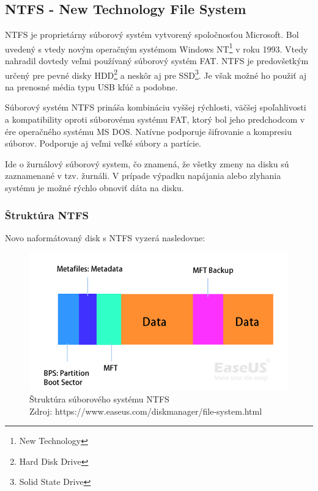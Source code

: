 \documentclass[12pt,oneside,slovak,a4paper]{article}
\begin{document}
\subsection{NTFS - New Technology File System}
NTFS je proprietárny súborový systém vytvorený spoločnosťou Microsoft. Bol uvedený s vtedy novým operačným systémom Windows NT\footnote{New Technology} v roku 1993. Vtedy nahradil dovtedy veľmi používaný súborový systém FAT. NTFS je predovšetkým určený pre pevné disky HDD\footnote{Hard Disk Drive} a neskôr aj pre SSD\footnote{Solid State Drive}. Je však možné ho použiť aj na prenosné média typu USB kľúč a podobne.

Súborový systém NTFS prináša kombináciu vyššej rýchlosti, väčšej spoľahlivosti a kompatibility oproti súborovému systému FAT, ktorý bol jeho predchodcom v ére operačného systému MS DOS. Natívne podporuje šifrovanie a kompresiu súborov. Podporuje aj veľmi veľké súbory a partície.

Ide o žurnálový súborový system, čo znamená, že všetky zmeny na disku sú zaznamenané v tzv. žurnáli. V prípade výpadku napájania alebo zlyhania systému je možné rýchlo obnoviť dáta na disku.

\subsubsection{Štruktúra NTFS}
Novo naformátovaný disk s NTFS vyzerá nasledovne:

\begin{figure}[H]
	\centering
	\captionsetup{justification=centering,margin=2cm}
	\includegraphics[scale=0.59]{./images/file_system_structure/ntfs-file-system-structure.png}
	\centering
	\caption{Štruktúra súborového systému NTFS \\ Zdroj: https://www.easeus.com/diskmanager/file-system.html}
\end{figure}
\end{document}
